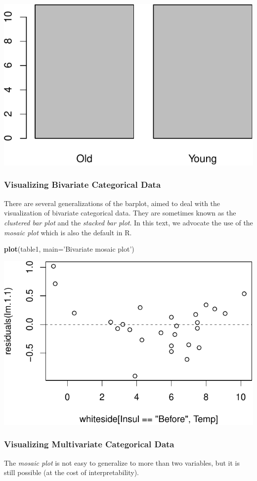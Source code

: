 \documentclass[]{book}
\newenvironment{Shaded}{\begin{snugshade}}{\end{snugshade}}
\newcommand{\KeywordTok}[1]{\textcolor[rgb]{0.13,0.29,0.53}{\textbf{#1}}}
\newcommand{\DataTypeTok}[1]{\textcolor[rgb]{0.13,0.29,0.53}{#1}}
\newcommand{\StringTok}[1]{\textcolor[rgb]{0.31,0.60,0.02}{#1}}
\newcommand{\NormalTok}[1]{#1}
\theoremstyle{definition}
\theoremstyle{definition}
\theoremstyle{definition}
\theoremstyle{remark}
\begin{document}
\includegraphics[width=0.5\linewidth]{Rcourse_files/figure-latex/barplot-1}

\subsubsection{Visualizing Bivariate Categorical
Data}\label{visualizing-bivariate-categorical-data}

There are several generalizations of the barplot, aimed to deal with the
visualization of bivariate categorical data. They are sometimes known as
the \emph{clustered bar plot} and the \emph{stacked bar plot}. In this
text, we advocate the use of the \emph{mosaic plot} which is also the
default in R.

\begin{Shaded}
\begin{Highlighting}[]
\KeywordTok{plot}\NormalTok{(table1, }\DataTypeTok{main=}\StringTok{'Bivariate mosaic plot'}\NormalTok{)}
\end{Highlighting}
\end{Shaded}

\includegraphics[width=0.5\linewidth]{Rcourse_files/figure-latex/unnamed-chunk-113-1}

\subsubsection{Visualizing Multivariate Categorical
Data}\label{visualizing-multivariate-categorical-data}

The \emph{mosaic plot} is not easy to generalize to more than two
variables, but it is still possible (at the cost of interpretability).
\end{document}
